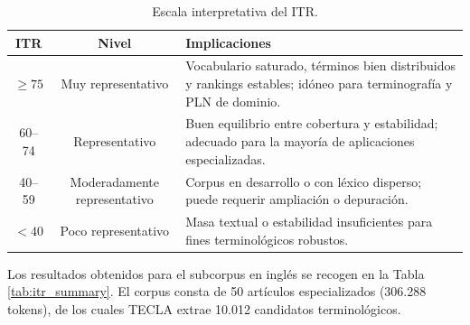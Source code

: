 \begin{table}[H]
\centering
\fontsize{10}{12}\selectfont
\begin{tabularx}{\textwidth}{c c X}
\toprule
\textbf{ITR} & \textbf{Nivel} & \textbf{Implicaciones} \\
\midrule
$\geq 75$ & Muy representativo
    & Vocabulario saturado, términos bien distribuidos y rankings
      estables; idóneo para terminografía y PLN de dominio. \\
60–74 & Representativo
    & Buen equilibrio entre cobertura y estabilidad; adecuado para
      la mayoría de aplicaciones especializadas. \\
40–59 & Moderadamente representativo
    & Corpus en desarrollo o con léxico disperso; puede requerir
      ampliación o depuración. \\
$< 40$ & Poco representativo
    & Masa textual o estabilidad insuficientes para fines
      terminológicos robustos. \\
\bottomrule
\end{tabularx}
\caption{Escala interpretativa del ITR.}
\label{tab:escala_itr}
\end{table}

Los resultados obtenidos para el subcorpus en inglés se recogen en la Tabla
\ref{tab:itr_summary}. El corpus consta de 50 artículos especializados
(306.288 tokens), de los cuales TECLA extrae 10.012 candidatos terminológicos.

